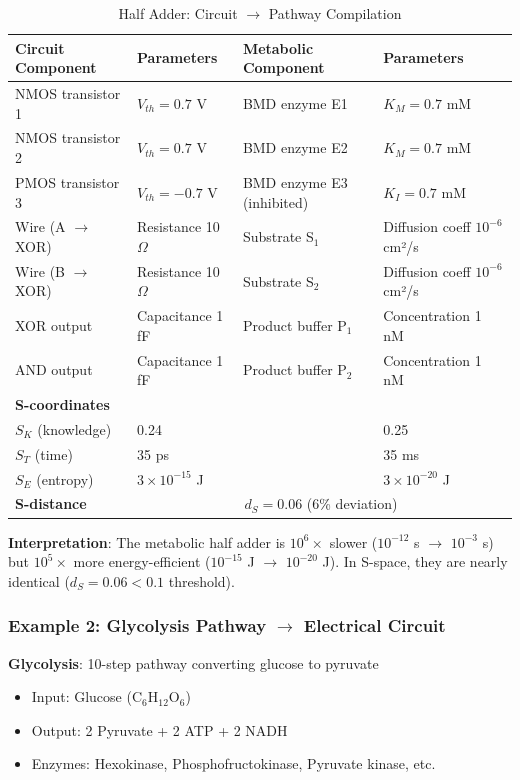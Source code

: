\documentclass[11pt,a4paper]{article}
\begin{document}
\begin{table}[H]
\centering
\caption{Half Adder: Circuit $\to$ Pathway Compilation}
\small
\begin{tabular}{llll}
\toprule
\textbf{Circuit Component} & \textbf{Parameters} & \textbf{Metabolic Component} & \textbf{Parameters} \\
\midrule
NMOS transistor 1 & $V_{th} = 0.7$ V & BMD enzyme E1 & $K_M = 0.7$ mM \\
NMOS transistor 2 & $V_{th} = 0.7$ V & BMD enzyme E2 & $K_M = 0.7$ mM \\
PMOS transistor 3 & $V_{th} = -0.7$ V & BMD enzyme E3 (inhibited) & $K_I = 0.7$ mM \\
Wire (A $\to$ XOR) & Resistance 10 $\Omega$ & Substrate S$_1$ & Diffusion coeff $10^{-6}$ cm²/s \\
Wire (B $\to$ XOR) & Resistance 10 $\Omega$ & Substrate S$_2$ & Diffusion coeff $10^{-6}$ cm²/s \\
XOR output & Capacitance 1 fF & Product buffer P$_1$ & Concentration 1 nM \\
AND output & Capacitance 1 fF & Product buffer P$_2$ & Concentration 1 nM \\
\midrule
\textbf{S-coordinates} & & & \\
$S_K$ (knowledge) & 0.24 & & 0.25 \\
$S_T$ (time) & 35 ps & & 35 ms \\
$S_E$ (entropy) & $3 \times 10^{-15}$ J & & $3 \times 10^{-20}$ J \\
\midrule
\textbf{S-distance} & \multicolumn{3}{c}{$d_S = 0.06$ (6\% deviation)} \\
\bottomrule
\end{tabular}
\end{table}

\textbf{Interpretation}: The metabolic half adder is $10^6\times$ slower ($10^{-12}$ s $\to$ $10^{-3}$ s) but $10^5\times$ more energy-efficient ($10^{-15}$ J $\to$ $10^{-20}$ J). In S-space, they are nearly identical ($d_S = 0.06 < 0.1$ threshold).

\subsubsection{Example 2: Glycolysis Pathway $\to$ Electrical Circuit}

\textbf{Glycolysis}: 10-step pathway converting glucose to pyruvate
\begin{itemize}
\item Input: Glucose (C$_6$H$_{12}$O$_6$)
\item Output: 2 Pyruvate + 2 ATP + 2 NADH
\item Enzymes: Hexokinase, Phosphofructokinase, Pyruvate kinase, etc.
\end{itemize}
\end{document}
